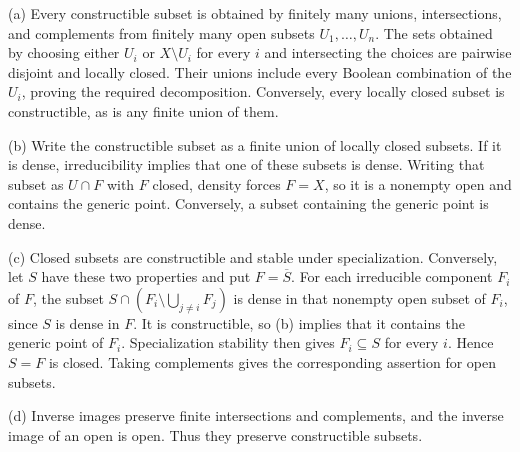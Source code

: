 (a) Every constructible subset is obtained by finitely many unions, intersections, and complements from finitely many open subsets $U_1,\ldots,U_n$. The sets obtained by choosing either $U_i$ or $X\setminus U_i$ for every $i$ and intersecting the choices are pairwise disjoint and locally closed. Their unions include every Boolean combination of the $U_i$, proving the required decomposition. Conversely, every locally closed subset is constructible, as is any finite union of them.

(b) Write the constructible subset as a finite union of locally closed subsets. If it is dense, irreducibility implies that one of these subsets is dense. Writing that subset as $U\cap F$ with $F$ closed, density forces $F=X$, so it is a nonempty open and contains the generic point. Conversely, a subset containing the generic point is dense.

(c) Closed subsets are constructible and stable under specialization. Conversely, let $S$ have these two properties and put $F=\overline S$. For each irreducible component $F_i$ of $F$, the subset $S\cap(F_i\setminus\bigcup_{j\ne i}F_j)$ is dense in that nonempty open subset of $F_i$, since $S$ is dense in $F$. It is constructible, so (b) implies that it contains the generic point of $F_i$. Specialization stability then gives $F_i\subseteq S$ for every $i$. Hence $S=F$ is closed. Taking complements gives the corresponding assertion for open subsets.

(d) Inverse images preserve finite intersections and complements, and the inverse image of an open is open. Thus they preserve constructible subsets.
